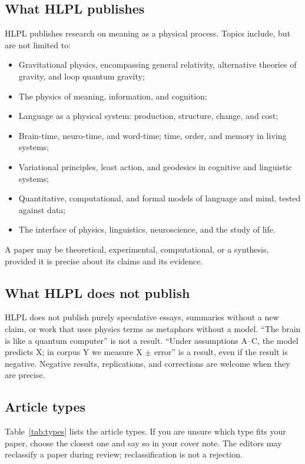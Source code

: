 \documentclass[9pt,a4paper,twocolumn]{article}
\begin{document}
\subsection{What HLPL publishes}
HLPL publishes research on meaning as a physical process. Topics include, but are not limited to:
\begin{tcolorbox}[
    colback=white,
    colframe=white,
    arc=4pt,
    boxrule=0mm,
    left=15pt, right=15pt, top=0pt, bottom=0pt
]
\begin{itemize}[label=\textcolor{squaregrey}{\tiny$\blacksquare$}, leftmargin=*]
    \item Gravitational physics, encompassing general relativity, alternative theories of gravity, and loop quantum gravity;
    \item The physics of meaning, information, and cognition;
    \item Language as a physical system: production, structure, change, and cost;
    \item Brain-time, neuro-time, and word-time; time, order, and memory in living systems;
    \item Variational principles, least action, and geodesics in cognitive and linguistic systems;
    \item Quantitative, computational, and formal models of language and mind, tested against data;
    \item The interface of physics, linguistics, neuroscience, and the study of life.
\end{itemize}
\end{tcolorbox}

A paper may be theoretical, experimental, computational, or a synthesis, provided it is precise about its claims and its evidence.

\subsection{What HLPL does not publish}
HLPL does not publish purely speculative essays, summaries without a new claim, or work that uses physics terms as metaphors without a model. ``The brain is like a quantum computer'' is not a result. ``Under assumptions A--C, the model predicts X; in corpus Y we measure X $\pm$ error'' is a result, even if the result is negative. Negative results, replications, and corrections are welcome when they are precise.

\subsection{Article types}
Table~\ref{tab:types} lists the article types. If you are unsure which type fits your paper, choose the closest one and say so in your cover note. The editors may reclassify a paper during review; reclassification is not a rejection.
\end{document}
